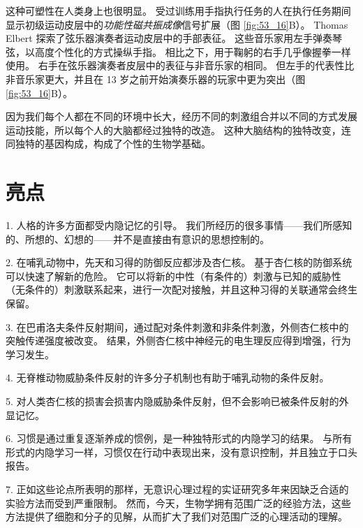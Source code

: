 这种可塑性在人类身上也很明显。
受过训练用手指执行任务的人在执行任务期间显示初级运动皮层中的\textit{功能性磁共振成像}信号扩展（图 \ref{fig:53_16}B）。
Thomas Elbert 探索了弦乐器演奏者运动皮层中的手部表征。
这些音乐家用左手弹奏琴弦，以高度个性化的方式操纵手指。
相比之下，用于鞠躬的右手几乎像握拳一样使用。
右手在弦乐器演奏者皮层中的表征与非音乐家的相同。
但左手的代表性比非音乐家更大，并且在 13 岁之前开始演奏乐器的玩家中更为突出（图 \ref{fig:53_16}B）。


因为我们每个人都在不同的环境中长大，经历不同的刺激组合并以不同的方式发展运动技能，所以每个人的大脑都经过独特的改造。
这种大脑结构的独特改变，连同独特的基因构成，构成了个性的生物学基础。



\section{亮点}

1. 人格的许多方面都受内隐记忆的引导。
我们所经历的很多事情——我们所感知的、所想的、幻想的——并不是直接由有意识的思想控制的。 


2. 在哺乳动物中，先天和习得的防御反应都涉及杏仁核。 基于杏仁核的防御系统可以快速了解新的危险。
它可以将新的中性（有条件的）刺激与已知的威胁性（无条件的）刺激联系起来，进行一次配对接触，并且这种习得的关联通常会终生保留。


3. 在巴甫洛夫条件反射期间，通过配对条件刺激和非条件刺激，外侧杏仁核中的突触传递强度被改变。
结果，外侧杏仁核中神经元的电生理反应得到增强，行为学习发生。


4. 无脊椎动物威胁条件反射的许多分子机制也有助于哺乳动物的条件反射。


5. 对人类杏仁核的损害会损害内隐威胁条件反射，但不会影响已被条件反射的外显记忆。


6. 习惯是通过重复逐渐养成的惯例，是一种独特形式的内隐学习的结果。
与所有形式的内隐学习一样，习惯仅在行动中表现出来，没有意识控制，并且独立于口头报告。


7. 正如这些论点所表明的那样，无意识心理过程的实证研究多年来因缺乏合适的实验方法而受到严重限制。
然而，今天，生物学拥有范围广泛的经验方法，这些方法提供了细胞和分子的见解，从而扩大了我们对范围广泛的心理活动的理解。


